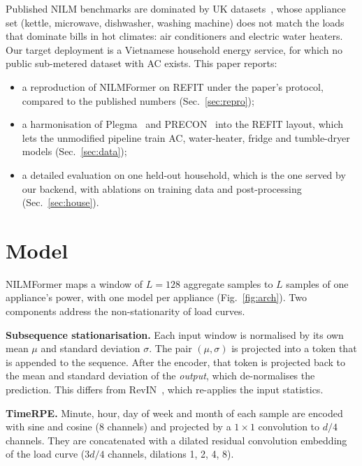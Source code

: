 \documentclass[conference]{IEEEtran}
\begin{document}
Published NILM benchmarks are dominated by UK datasets~\cite{murray2017refit,kelly2015ukdale},
whose appliance set (kettle, microwave, dishwasher, washing machine) does not match the loads that
dominate bills in hot climates: air conditioners and electric water heaters. Our target
deployment is a Vietnamese household energy service, for which no public sub-metered dataset
with AC exists. This paper reports:
\begin{itemize}
  \item a reproduction of NILMFormer on REFIT under the paper's protocol, compared to the
        published numbers (Sec.~\ref{sec:repro});
  \item a harmonisation of Plegma~\cite{athanasoulias2024plegma} and PRECON~\cite{nadeem2019precon}
        into the REFIT layout, which lets the unmodified pipeline train AC, water-heater, fridge
        and tumble-dryer models (Sec.~\ref{sec:data});
  \item a detailed evaluation on one held-out household, which is the one served by our backend,
        with ablations on training data and post-processing (Sec.~\ref{sec:house}).
\end{itemize}

\section{Model}\label{sec:model}
NILMFormer maps a window of $L=128$ aggregate samples to $L$ samples of one appliance's power,
with one model per appliance (Fig.~\ref{fig:arch}). Two components address the non-stationarity
of load curves.

\textbf{Subsequence stationarisation.} Each input window is normalised by its own mean $\mu$ and
standard deviation $\sigma$. The pair $(\mu,\sigma)$ is projected into a token that is appended to
the sequence. After the encoder, that token is projected back to the mean and standard deviation of
the \emph{output}, which de-normalises the prediction. This differs from RevIN~\cite{kim2022revin},
which re-applies the input statistics.

\textbf{TimeRPE.} Minute, hour, day of week and month of each sample are encoded with sine and
cosine (8 channels) and projected by a $1{\times}1$ convolution to $d/4$ channels. They are
concatenated with a dilated residual convolution embedding of the load curve ($3d/4$ channels,
dilations 1, 2, 4, 8).
\end{document}
